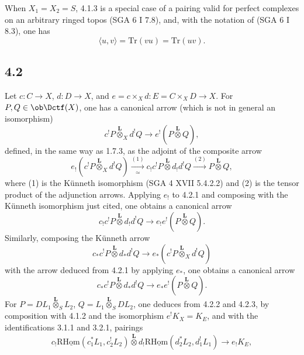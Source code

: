 When $X_1=X_2=S$, 4.1.3 is a special case of a pairing valid for perfect complexes on an arbitrary ringed topos (SGA 6 I 7.8), and, with the notation of (SGA 6 I 8.3), one has
\begin{equation}
\langle u,v\rangle=\mathrm{Tr}(vu)=\mathrm{Tr}(uv).
\tag{4.1.5}
\end{equation}

\subsection*{4.2}
Let $c:C\to X$, $d:D\to X$, and $e=c\times_Xd:E=C\times_XD\to X$. For $P,Q\in\ob\Dctf(X)$, one has a canonical arrow (which is not in general an isomorphism)
\begin{equation}
c^!P\overset{\mathbf L}{\otimes}_X d^!Q
\longrightarrow e^!(P\overset{\mathbf L}{\otimes}Q),
\tag{4.2.1}
\end{equation}
defined, in the same way as 1.7.3, as the adjoint of the composite arrow
\[
e_!(c^!P\overset{\mathbf L}{\otimes}_X d^!Q)
\xrightarrow[\simeq]{(1)}
 c_!c^!P\overset{\mathbf L}{\otimes}d_!d^!Q
\xrightarrow{(2)} P\overset{\mathbf L}{\otimes}Q,
\]
where (1) is the Künneth isomorphism (SGA 4 XVII 5.4.2.2) and (2) is the tensor product of the adjunction arrows. Applying $e_!$ to 4.2.1 and composing with the Künneth isomorphism just cited, one obtains a canonical arrow
\begin{equation}
c_!c^!P\overset{\mathbf L}{\otimes}d_!d^!Q
\longrightarrow e_!e^!(P\overset{\mathbf L}{\otimes}Q).
\tag{4.2.2}
\end{equation}
Similarly, composing the Künneth arrow
\[
c_*c^!P\overset{\mathbf L}{\otimes}d_*d^!Q
\longrightarrow e_*(c^!P\overset{\mathbf L}{\otimes}_X d^!Q)
\]
with the arrow deduced from 4.2.1 by applying $e_*$, one obtains a canonical arrow
\begin{equation}
c_*c^!P\overset{\mathbf L}{\otimes}d_*d^!Q
\longrightarrow e_*e^!(P\overset{\mathbf L}{\otimes}Q).
\tag{4.2.3}
\end{equation}
For $P=DL_1\overset{\mathbf L}{\otimes}_S L_2$, $Q=L_1\overset{\mathbf L}{\otimes}_S DL_2$, one deduces from 4.2.2 and 4.2.3, by composition with 4.1.2 and the isomorphism $e^!K_X=K_E$, and with the identifications 3.1.1 and 3.2.1, pairings
\begin{equation}
c_!\mathrm{R}\underline{\mathrm{Hom}}(c_1^*L_1,c_2^!L_2)\overset{\mathbf L}{\otimes}
 d_!\mathrm{R}\underline{\mathrm{Hom}}(d_2^*L_2,d_1^!L_1)
\longrightarrow e_!K_E,
\tag{4.2.4}
\end{equation}
